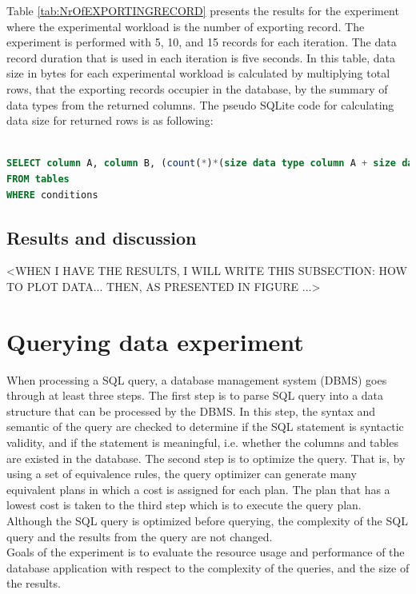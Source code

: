 Table \ref{tab:NrOfEXPORTINGRECORD} presents the results for the experiment where the experimental workload is the number of exporting record. The experiment is performed with 5, 10, and 15 records for each iteration. The data record duration that is used in each iteration is five seconds. In this table, data size in bytes for each experimental workload is calculated by multiplying total rows, that the exporting records occupier in the database, by the summary of data types from the returned columns. The pseudo SQLite code for calculating data size for returned rows is as following:\\\\
\begin{minipage}{\linewidth}
\begin{lstlisting}[caption={Pseudo SQLite code for calculating data size for returned rows}, label = {listing:SQLiteSizeCode}, captionpos=b, language=SQL, basicstyle=\small]
SELECT column A, column B, (count(*)*(size data type column A + size data type column B)) as datasize
FROM tables
WHERE conditions
\end{lstlisting}
\end{minipage}
\subsection{Results and discussion}
<WHEN I HAVE THE RESULTS, I WILL WRITE THIS SUBSECTION: HOW TO PLOT DATA... THEN, AS PRESENTED IN FIGURE ...>
\section{Querying data experiment}
When processing a SQL query, a database management system (DBMS) goes through at least three steps. The first step is to parse SQL query into a data structure that can be processed by the DBMS. In this step, the syntax and semantic of the query are checked to determine if the SQL statement is syntactic validity, and if the statement is meaningful, i.e. whether the columns and tables are existed in the database. The second step is to optimize the query. That is, by using a set of equivalence rules, the query optimizer can generate many equivalent plans in which a cost is assigned for each plan. The plan that has a lowest cost is taken to the third step which is to execute the query plan. Although the SQL query is optimized before querying, the complexity of the SQL query and the results from the query are not changed.\\
Goals of the experiment is to evaluate the resource usage and performance of the database application with respect to the complexity of the queries, and the size of the results.
